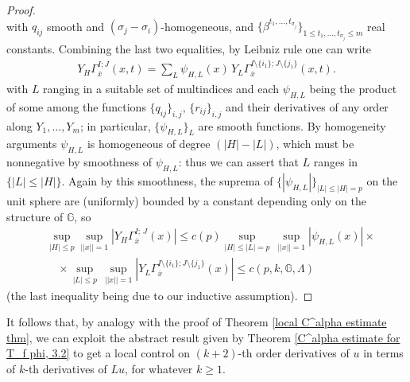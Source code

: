 \documentclass{article}
\numberwithin{equation}{section}
\begin{document}
\begin{proof}
\begin{equation*}
    \end{equation*}
    with $q_{ij}$ smooth and $(\sigma_j-\sigma_i)$-homogeneous, and $\{\beta^{t_1,...,t_{\sigma_j}}\}_{1 \leq t_1,...,t_{\sigma_j} \leq m}$ real constants. Combining the last two equalities, by Leibniz rule one can write
    \begin{align*}
        Y_{H} \Gamma_{\overline{x}}^{I;J}(x,t)=\sum_{L} \psi_{H,L}(x) \, Y_{L} \Gamma_{\overline{x}}^{I \setminus \{i_1\}; J \setminus \{j_1\}}(x,t).
    \end{align*}
    with $L$ ranging in a suitable set of multindices and each $\psi_{H,L}$ being the product of some among the functions $\{q_{ij}\}_{i,j}, \, \{r_{ij}\}_{i,j}$ and their derivatives of any order along $Y_1,...,Y_m$; in particular, $\{\psi_{H,L}\}_L$ are smooth functions. By homogeneity arguments $\psi_{H,L}$ is homogeneous of degree $(|H|-|L|)$, which must be nonnegative by smoothness of $\psi_{H,L}$: thus we can assert that $L$ ranges in $\{|L| \leq |H|\}$.
    Again by this smoothness, the suprema of $\{|\psi_{H,L}|\}_{|L| \leq |H| = p}$ on the unit sphere are (uniformly) bounded by a constant depending only on the structure of $\mathbb{G}$, so
    \begin{align*}
        & \sup_{|H| \leq p} \sup_{||x||=1} |Y_H \Gamma_{\overline{x}}^{I; \, J}(x)| \leq c(p) \sup_{|H| \leq |L| = p} \, \sup_{||x||=1} |\psi_{H,L}(x)| \times \\
        & \quad \times \sup_{|L| \leq p} \, \sup_{||x||=1} |Y_L \Gamma_{\overline{x}}^{I \setminus \{i_1\}; J \setminus \{j_1\}}(x)| \leq c(p,k,\mathbb{G},\Lambda)
    \end{align*}
        (the last inequality being due to our inductive assumption).
\end{proof}

\vspace{2mm}

\hspace{-7mm} It follows that, by analogy with the proof of Theorem \ref{local C^alpha estimate thm}, we can exploit the abstract result given by Theorem \ref{C^alpha estimate for T_f phi, 3.2} to get a local control on $(k+2)$-th order derivatives of $u$ in terms of $k$-th derivatives of $Lu$, for whatever $k \geq 1$. 

\vspace{2mm}
\end{document}
